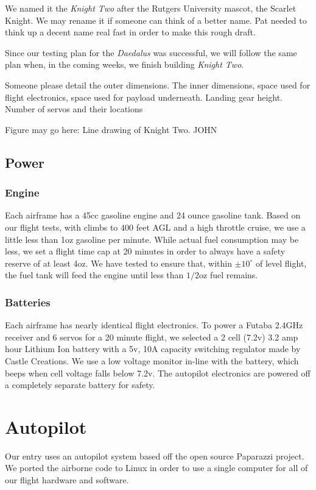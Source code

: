 \documentclass[10pt]{report}
\newcommand{\degrees}[1]
{
\begin{math}
#1^{\circ} 
\end{math}
}
\begin{document}
We named it the \emph{Knight Two} after the Rutgers University mascot, the Scarlet Knight. We may rename it if someone can think of a better name. Pat needed to think up a decent name real fast in order to make this rough draft.

Since our testing plan for the \emph{Daedalus} was successful, we will follow the same plan when, in the coming weeks, we finish building \emph{Knight Two}.


Someone please detail the outer dimensions. The inner dimensions, space used for flight electronics, space used for payload underneath. Landing gear height. Number of servos and their locations

Figure may go here: Line drawing of Knight Two. JOHN

\subsection{Power}

\subsubsection{Engine}

Each airframe has a 45cc gasoline engine and 24 ounce gasoline tank. Based on our flight tests, with climbs to 400 feet AGL and a high throttle cruise, we use a little less than 1oz gasoline per minute. While actual fuel consumption may be less, we set a flight time cap at 20 minutes in order to always have a safety reserve of at least 4oz. We have tested to ensure that, within \degrees{\pm10} of level flight, the fuel tank will feed the engine until less than $1/2$oz fuel remains.

\subsubsection{Batteries}

Each airframe has nearly identical flight electronics. To power a Futaba 2.4GHz receiver and 6 servos for a 20 minute flight, we selected a 2 cell (7.2v) 3.2 amp hour Lithium Ion battery with a 5v, 10A capacity switching regulator made by Castle Creations. We use a low voltage monitor in-line with the battery, which beeps when cell voltage falls below 7.2v. The autopilot electronics are powered off a completely separate battery for safety.

\section{Autopilot}
Our entry uses an autopilot system based off the open source 
Paparazzi project\cite{paparazziweb}. 
We ported the airborne code to Linux in order to use a single computer for all of our flight hardware and software.
\end{document}
